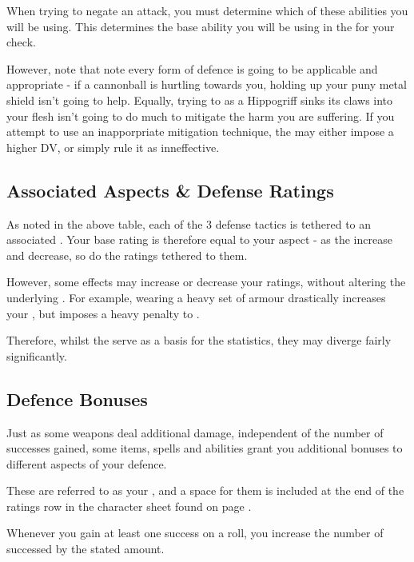 When trying to negate an attack, you must determine which of these abilities you will be using. This determines the base ability you will be using in the  for your  check. 

However, note that note every form of defence is going to be applicable and appropriate - if a cannonball is hurtling towards you, holding up your puny metal shield isn't going to help. Equally, trying to  as a Hippogriff sinks its claws into your flesh isn't going to do much to mitigate the harm you are suffering. If you attempt to use an inapporpriate mitigation technique, the  may either impose a higher DV, or simply rule it as inneffective. 

\subsection{Associated Aspects \& Defense Ratings}

As noted in the above table, each of the 3 defense tactics is tethered to an associated . Your base  rating is therefore equal to your  aspect - as the  increase and decrease, so do the  ratings tethered to them. 

However, some effects may increase or decrease your  ratings, without altering the underlying . For example, wearing a heavy set of armour drastically increases your , but imposes a heavy penalty to . 

Therefore, whilst the  serve as a basis for the  statistics, they may diverge fairly significantly. 

\subsection{Defence Bonuses}

Just as some weapons deal additional damage, independent of the number of successes gained, some items, spells and abilities grant you additional bonuses to different aspects of your defence.

These are referred to as your , and a space for them is included at the end of the ratings row in the character sheet found on page \pageref{S:CharacterSheet}.

Whenever you gain at least one success on a  roll, you increase the number of successed by the stated amount. 


